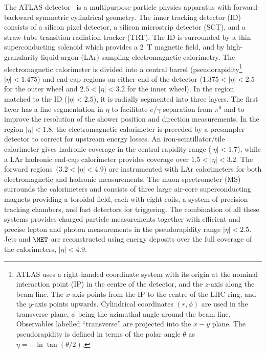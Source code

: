 \documentclass[final,3p,times,twocolumn]{elsarticle}
\begin{document}
The ATLAS detector~\cite{ATLASLOI,ATLASTP,atlas-det} is a multipurpose particle physics
apparatus with forward-backward symmetric cylindrical geometry. The
inner tracking detector (ID) consists of a silicon pixel detector, a
silicon microstrip detector (SCT), and a straw-tube transition radiation tracker
(TRT).  The ID is surrounded by a thin superconducting solenoid which
provides a 2~T magnetic field, and by high-granularity liquid-argon
(LAr) sampling electromagnetic calorimetry.  The electromagnetic
calorimeter is divided into a central barrel (pseudorapidity\footnote{ATLAS
  uses a right-handed coordinate system with its origin at the nominal
  interaction point (IP) in the centre of the detector, and the
  $z$-axis along the beam line.  The $x$-axis points from the IP to
  the centre of the LHC ring, and the $y$-axis points upwards.
  Cylindrical coordinates $(r,\phi)$ are used in the transverse plane,
  $\phi$ being the azimuthal angle around the beam line.  Observables
  labelled ``transverse'' are projected into the $x-y$ plane.
  The pseudorapidity is defined in terms of the polar angle $\theta$ as
  $\eta=-\ln\tan(\theta/2)$.} 
$|\eta|<1.475$) and 
end-cap regions on either end of the detector ($1.375 < |\eta| <2.5$ for the outer wheel and $2.5< |\eta| <3.2$ for the
inner wheel). In the region matched to the ID ($|\eta|<2.5$), it is 
radially segmented into three layers. The first layer has a fine segmentation 
in $\eta$ to facilitate $e$/$\gamma$ separation from $\pi^0$ and to improve 
the resolution of the shower position and direction measurements.
In the region $|\eta|<1.8$, the electromagnetic calorimeter is
preceded by a presampler detector to correct for upstream energy losses.
An iron-scintillator/tile calorimeter gives hadronic coverage in the 
central rapidity range ($|\eta| < 1.7$), while a LAr hadronic end-cap calorimeter 
provides coverage over $1.5<|\eta|<3.2$. 
The forward regions~($3.2< |\eta| <4.9$) are 
instrumented with LAr calorimeters for both electromagnetic and 
hadronic measurements.
The muon spectrometer (MS) surrounds the
calorimeters and consists of three large air-core superconducting
magnets providing a toroidal field, each with eight coils, a system of
precision tracking chambers, and fast detectors for triggering. The
combination of all these systems provides charged particle measurements
together with efficient and precise lepton and photon
measurements in the pseudorapidity range $|\eta| < 2.5$. Jets and
$\MET$ are reconstructed using energy deposits over the
full coverage of the calorimeters, $|\eta| < 4.9$.
				   
\end{document}
